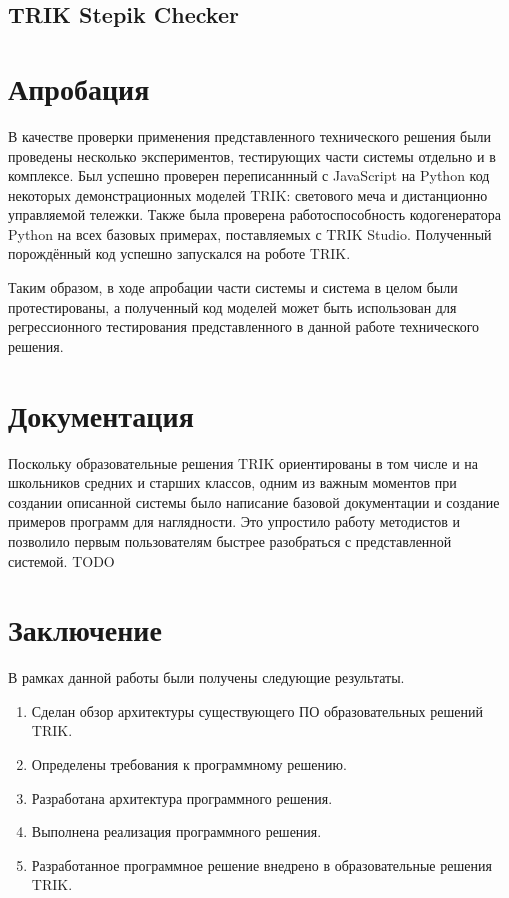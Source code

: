 \documentclass[14pt]{matmex-diploma-custom}
\begin{document}
\subsection{TRIK Stepik Checker}



\section{Апробация}
В качестве проверки применения представленного технического решения были проведены несколько экспериментов, тестирующих части системы отдельно и в комплексе. Был успешно проверен переписаннный с JavaScript на Python код некоторых демонстрационных моделей TRIK: светового меча и дистанционно управляемой тележки. Также была проверена работоспособность кодогенератора Python на всех базовых примерах, поставляемых с TRIK Studio. Полученный порождённый код успешно запускался на роботе TRIK. 

Таким образом, в ходе апробации части системы и система в целом были протестированы, а полученный код моделей может быть использован для регрессионного тестирования представленного в данной работе технического решения.

\section{Документация}
Поскольку образовательные решения TRIK ориентированы в том числе и на школьников средних и старших классов, одним из важным моментов при создании описанной системы было написание базовой документации и создание примеров программ для наглядности. Это упростило работу методистов и позволило первым пользователям быстрее разобраться с представленной системой. TODO


\section*{Заключение}

В рамках данной работы были получены следующие результаты.
\begin{enumerate}
\item Сделан обзор архитектуры существующего ПО образовательных решений TRIK.
\item Определены требования к программному решению.
\item Разработана архитектура программного решения.
\item Выполнена реализация программного решения.
\item Разработанное программное решение внедрено в образовательные решения TRIK.
\end{enumerate}
\end{document}
